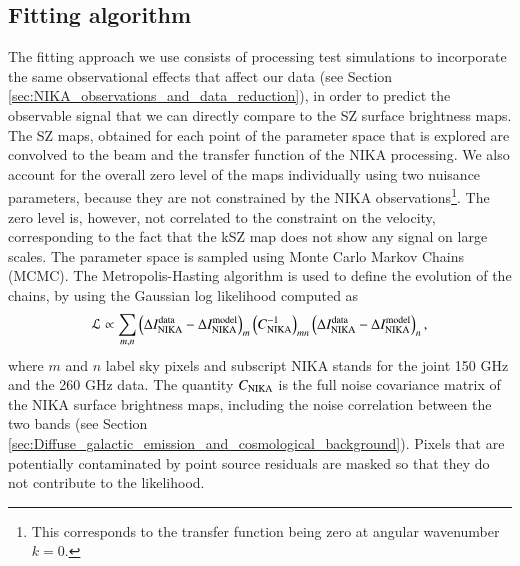 \documentclass[twocolumn,traditabstract]{aa}
\begin{document}
\subsection{Fitting algorithm}\label{sec:Fitting_algorithm}
The fitting approach we use consists of processing test simulations to incorporate the same observational effects that affect our data (see Section \ref{sec:NIKA_observations_and_data_reduction}), in order to predict the observable signal that we can directly compare to the SZ surface brightness maps. The SZ maps, obtained for each point of the parameter space that is explored are convolved to the beam and the transfer function of the NIKA processing. We also account for the overall zero level of the maps individually using two nuisance parameters, because they are not constrained by the NIKA observations\footnote{This corresponds to the transfer function being zero at angular wavenumber $k=0$.}. The zero level is, however, not correlated to the constraint on the velocity, corresponding to the fact that the kSZ map does not show any signal on large scales. The parameter space is sampled using Monte Carlo Markov Chains (MCMC). The Metropolis-Hasting algorithm \citep[e.g.,][]{Chib1995} is used to define the evolution of the chains, by using the Gaussian log likelihood computed as
\begin{equation}
\mathcal{L} \propto \sum\limits_{m,n} \left(\Delta I_{\rm NIKA}^{\rm data} - \Delta I_{\rm NIKA}^{\rm model}\right)_m \left(C_{\rm NIKA}^{-1}\right)_{mn} \left(\Delta I_{\rm NIKA}^{\rm data} - \Delta I_{\rm NIKA}^{\rm model}\right)_n,
\label{eq:likelihood1}
\end{equation}
where $m$ and $n$ label sky pixels and subscript NIKA stands for the joint 150 GHz and the 260 GHz data. The quantity $C_{\rm NIKA}$ is the full noise covariance matrix of the NIKA surface brightness maps, including the noise correlation between the two bands (see Section \ref{sec:Diffuse_galactic_emission_and_cosmological_background}). Pixels that are potentially contaminated by point source residuals are masked so that they do not contribute to the likelihood. 
\end{document}
